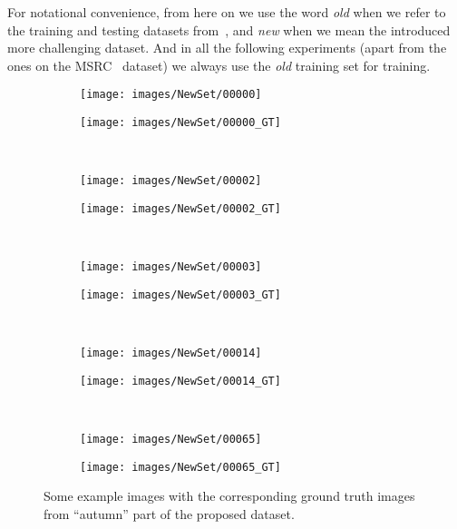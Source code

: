 For notational convenience, from here on we use the word \emph{old} when we refer to the training and testing datasets from~\cite{Wojek2008},
and \emph{new} when we mean the introduced more challenging dataset. And in all the following experiments (apart from the ones on the 
MSRC~\cite{MSRC} dataset) we always use the \emph{old} training set for training.



\begin{figure}[t]
 \centering
 \begin{subfigure}[c]{0.4\textwidth}
  \centering
  \texttt{[image: images/NewSet/00000]}
 \end{subfigure}
 \begin{subfigure}[c]{0.4\textwidth}
  \centering
  \texttt{[image: images/NewSet/00000\_GT]}
 \end{subfigure}
 \\
 \begin{subfigure}[c]{0.4\textwidth}
  \centering
  \texttt{[image: images/NewSet/00002]}
 \end{subfigure}
 \begin{subfigure}[c]{0.4\textwidth}
  \centering
  \texttt{[image: images/NewSet/00002\_GT]}
 \end{subfigure}
 \\
 \begin{subfigure}[c]{0.4\textwidth}
  \centering
  \texttt{[image: images/NewSet/00003]}
 \end{subfigure}
 \begin{subfigure}[c]{0.4\textwidth}
  \centering
  \texttt{[image: images/NewSet/00003\_GT]}
 \end{subfigure}
 \\
 \begin{subfigure}[c]{0.4\textwidth}
  \centering
  \texttt{[image: images/NewSet/00014]}
 \end{subfigure}
 \begin{subfigure}[c]{0.4\textwidth}
  \centering
  \texttt{[image: images/NewSet/00014\_GT]}
 \end{subfigure}
 \\
 \begin{subfigure}[c]{0.4\textwidth}
  \centering
  \texttt{[image: images/NewSet/00065]}
 \end{subfigure}
 \begin{subfigure}[c]{0.4\textwidth}
  \centering
  \texttt{[image: images/NewSet/00065\_GT]}
 \end{subfigure}
 \caption{Some example images with the corresponding ground truth images from ``autumn'' part of the
 proposed dataset.}\label{fig:autumn_examples}
\end{figure}

